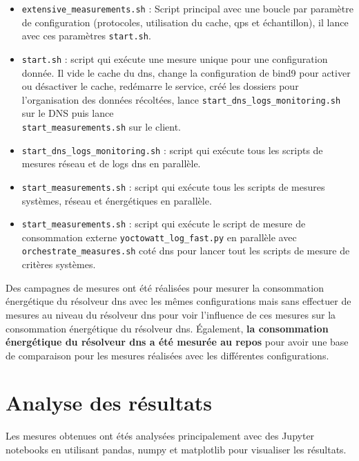 \documentclass[12pt, a4paper]{report}
\begin{document}
	\begin{itemize}
		\item \texttt{extensive\_measurements.sh} : Script principal avec une boucle par paramètre de configuration (protocoles, utilisation du cache, \gls{qps} et échantillon), il lance avec ces paramètres \texttt{start.sh}.

		\item \texttt{start.sh} : script qui exécute une mesure unique pour une configuration donnée. Il vide le cache du \gls{dns}, change la configuration de \gls{bind9} pour activer ou désactiver le cache, redémarre le service, créé les dossiers pour l'organisation des données récoltées, lance \texttt{start\_\gls{dns}\_logs\_monitoring.sh} sur le DNS puis lance \\ \texttt{start\_measurements.sh} sur le client.

		\item \texttt{start\_dns\_logs\_monitoring.sh} : script qui exécute tous les scripts de mesures réseau et de logs \gls{dns} en parallèle.

		\item \texttt{start\_measurements.sh} : script qui exécute tous les scripts de mesures systèmes, réseau et énergétiques en parallèle.

		\item \texttt{start\_measurements.sh} : script qui exécute le script de mesure de consommation externe \texttt{yoctowatt\_log\_fast.py} en parallèle avec \texttt{orchestrate\_measures.sh} coté \gls{dns} pour lancer tout les scripts de mesure de critères systèmes.
	\end{itemize}
	\vspace{0.5cm}

	Des campagnes de mesures ont été réalisées pour mesurer la consommation énergétique du résolveur \gls{dns} avec les mêmes configurations mais sans effectuer de mesures au niveau du résolveur \gls{dns} pour voir l'influence de ces mesures sur la consommation énergétique du résolveur \gls{dns}. Également, \textbf{la consommation énergétique du résolveur \gls{dns} a été mesurée au repos} pour avoir une base de comparaison pour les mesures réalisées avec les différentes configurations.


	\section{Analyse des résultats}

	Les mesures obtenues ont étés analysées principalement avec des Jupyter notebooks en utilisant pandas, numpy et matplotlib pour visualiser les résultats. 
\end{document}
